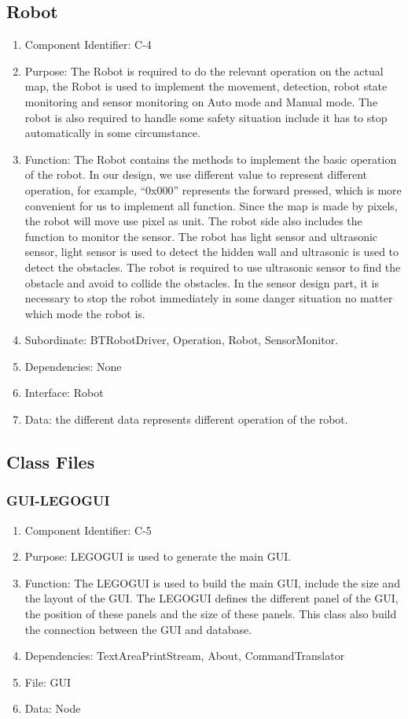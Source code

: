\documentclass[11pt, a4paper]{report}
\begin{document}
\subsection{Robot}
\begin{enumerate}
\item Component Identifier: C-4
\item Purpose: The Robot is required to do the relevant operation on the actual map, the Robot is used to implement the movement, detection, robot state monitoring and sensor monitoring on Auto mode and Manual mode. The robot is also required to handle some safety situation include it has to stop automatically in some circumstance. 
\item Function: The Robot contains the methods to implement the basic operation of the robot. In our design, we use different value to represent different operation, for example, ``0x000'' represents the forward pressed, which is more convenient for us to implement all function. Since the map is made by pixels, the robot will move use pixel as unit. The robot side also includes the function to monitor the sensor. The robot has light sensor and ultrasonic sensor, light sensor is used to detect the hidden wall and ultrasonic is used to detect the obstacles. The robot is required to use ultrasonic sensor to find the obstacle and avoid to collide the obstacles. In the sensor design part, it is necessary to stop the robot immediately in some danger situation no matter which mode the robot is.      
\item Subordinate: BTRobotDriver, Operation, Robot, SensorMonitor.
\item Dependencies: None
\item Interface: Robot 
\item Data: the different data represents different operation of the robot.  
\end{enumerate}

\subsection{Class Files}
\subsubsection{GUI-LEGOGUI}
\begin{enumerate}
\item Component Identifier: C-5
\item Purpose: LEGOGUI is used to generate the main GUI. 
\item Function: The LEGOGUI is used to build the main GUI, include the size and the layout of the GUI. The LEGOGUI defines the different panel of the GUI, the position of these panels and the size of these panels. This class also build the connection between the GUI and database.
\item Dependencies: TextAreaPrintStream, About, CommandTranslator
\item File: GUI
\item Data: Node
\end{enumerate}
\end{document}
